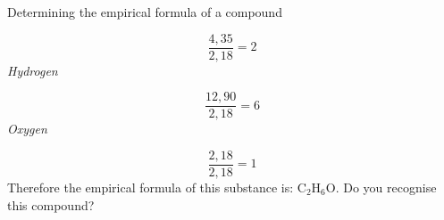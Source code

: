 \begin{wex}{Determining the empirical formula of a compound }
{    \begin{equation}
    \frac{4,35}{2,18}=2\tag{18.27}
      \end{equation}
      \label{m38712*id281217}
        \textsl{Hydrogen}
      \par 
      \label{m38712*id281223}\nopagebreak\noindent{}
        
    \begin{equation}
    \frac{12,90}{2,18}=6\tag{18.28}
      \end{equation}
      \label{m38712*id281254}
        \textsl{Oxygen}
      \par 
      \label{m38712*id281261}\nopagebreak\noindent{}
        
    \begin{equation}
    \frac{2,18}{2,18}=1\tag{18.29}
      \end{equation}
      \label{m38712*id281292}Therefore the empirical formula of this substance is: ${\mathrm{C}}_{2}{\mathrm{H}}_{6}\mathrm{O}$. Do you recognise this compound?\par 
}
    \end{wex}
    \noindent
\label{m38712*secfhsst!!!underscore!!!id1235}\vspace{.5cm} 
      \noindent
